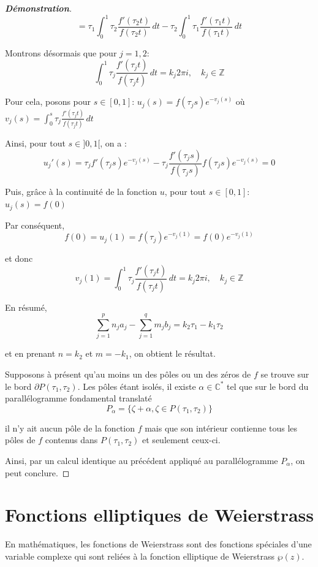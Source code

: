 \documentclass[12pt]{article}
\begin{document}
\begin{proof}[\textbf{Démonstration}]
        \[
        = \tau_1 \int_0^1 \tau_2 \frac{f'(\tau_2 t)}{f(\tau_2 t)} \, dt - \tau_2 \int_0^1 \tau_1 \frac{f'(\tau_1 t)}{f(\tau_1 t)} \, dt
        \]

        Montrons désormais que pour \( j = 1, 2 \):
        \[
        \int_0^1 \tau_j \frac{f'(\tau_j t)}{f(\tau_j t)} \, dt = k_j 2\pi i, \quad k_j \in \mathbb{Z}
        \]

        Pour cela, posons pour \( s \in [0,1] \): \( u_j(s) = f(\tau_j s)e^{-v_j(s)} \) où \( v_j(s) = \int_0^s \tau_j \frac{f'(\tau_j t)}{f(\tau_j t)} \, dt \)

        Ainsi, pour tout \( s \in ]0, 1[ \), on a :
        \[
        u_j'(s) = \tau_j f'(\tau_j s)e^{-v_j(s)} - \tau_j \frac{f'(\tau_j s)}{f(\tau_j s)} f(\tau_j s)e^{-v_j(s)} = 0
        \]

        Puis, grâce à la continuité de la fonction \( u \), pour tout \( s \in [0,1] \): \( u_j(s) = f(0) \)

        Par conséquent,
        \[
        f(0) = u_j(1) = f(\tau_j)e^{-v_j(1)} = f(0)e^{-v_j(1)}
        \]

        et donc
        \[
        v_j(1) = \int_0^1 \tau_j \frac{f'(\tau_j t)}{f(\tau_j t)} \, dt = k_j 2\pi i, \quad k_j \in \mathbb{Z}
        \]

        En résumé,
        \[
        \sum_{j=1}^p n_j a_j - \sum_{j=1}^q m_j b_j = k_2 \tau_1 - k_1 \tau_2
        \]

        et en prenant \( n = k_2 \) et \( m = -k_1 \), on obtient le résultat.

        Supposons à présent qu'au moins un des pôles ou un des zéros de \( f \) se trouve sur le bord \( \partial P(\tau_1, \tau_2) \). Les pôles étant isolés, il existe \( \alpha \in \mathbb{C}^* \) tel que sur le bord du parallélogramme fondamental translaté
        \[
        P_\alpha = \{\zeta + \alpha, \zeta \in P(\tau_1, \tau_2)\}
        \]

        il n'y ait aucun pôle de la fonction \( f \) mais que son intérieur contienne tous les pôles de \( f \) contenus dans \( P(\tau_1, \tau_2) \) et seulement ceux-ci.

        Ainsi, par un calcul identique au précédent appliqué au parallélogramme \( P_\alpha \), on peut conclure.

    \end{proof}
    \section{Fonctions elliptiques de Weierstrass}
    En mathématiques, les fonctions de Weierstrass sont des fonctions spéciales d'une variable complexe qui sont reliées à la fonction elliptique de Weierstrass $\wp(z)$.
\end{document}
